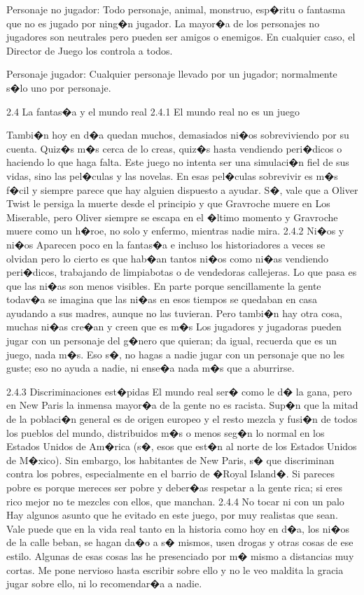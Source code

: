 Personaje no jugador: 
Todo personaje, animal, monstruo, esp�ritu o fantasma que no es jugado por ning�n jugador. La mayor�a de los personajes no jugadores son neutrales pero pueden ser amigos o enemigos. En cualquier caso, el Director de Juego los controla a todos.


Personaje jugador: 
Cualquier personaje llevado por un jugador; normalmente s�lo uno por personaje.


2.4 La fantas�a y el mundo real
2.4.1 El mundo real no es un juego


Tambi�n hoy en d�a quedan muchos, demasiados ni�os sobreviviendo por su cuenta. Quiz�s m�s cerca de lo creas, quiz�s hasta vendiendo peri�dicos o haciendo lo que haga falta. Este juego no intenta ser una simulaci�n fiel de sus vidas, sino las pel�culas y las novelas. En esas pel�culas sobrevivir es m�s f�cil y siempre parece que hay alguien dispuesto a ayudar. S�, vale que a Oliver Twist le persiga la muerte desde el principio y que Gravroche muere en Los Miserable, pero Oliver siempre se escapa en el �ltimo momento y Gravroche muere como un h�roe, no solo y enfermo, mientras nadie mira.
2.4.2 Ni�os y ni�os
Aparecen poco en la fantas�a e incluso los historiadores a veces se olvidan pero lo cierto es que hab�an tantos ni�os como ni�as vendiendo peri�dicos, trabajando de limpiabotas o de vendedoras callejeras. Lo que pasa es que las ni�as son menos visibles. En parte porque sencillamente la gente todav�a se imagina que las ni�as en esos tiempos se quedaban en casa ayudando a sus madres, aunque no las tuvieran. Pero tambi�n hay otra cosa, muchas ni�as cre�an y creen que es m�s
Los jugadores y jugadoras pueden jugar con un personaje del g�nero que quieran; da igual, recuerda que es un juego, nada m�s. Eso s�, no hagas a nadie jugar con un personaje que no les guste; eso no ayuda a nadie, ni ense�a nada m�s que a aburrirse.


2.4.3 Discriminaciones est�pidas
El mundo real ser� como le d� la gana, pero en New Paris la inmensa mayor�a de la gente no es racista. Sup�n que la mitad de la poblaci�n general es de origen europeo y el resto mezcla y fusi�n de todos los pueblos del mundo, distribuidos m�s o menos seg�n lo normal en los Estados Unidos de Am�rica (s�, esos que est�n al norte de los Estados Unidos de M�xico). 
Sin embargo, los habitantes de New Paris, s� que discriminan contra los pobres, especialmente en el barrio de �Royal Island�. Si pareces pobre es porque mereces ser pobre y deber�as respetar a la gente rica; si eres rico mejor no te mezcles con ellos, que manchan.
2.4.4 No tocar ni con un palo
Hay algunos asunto que he evitado en este juego, por muy realistas que sean. Vale puede que en la vida real tanto en la historia como hoy en d�a, los ni�os de la calle beban, se hagan da�o a s� mismos, usen drogas y otras cosas de ese estilo. Algunas de esas cosas las he presenciado por m� mismo a distancias muy cortas.
Me pone nervioso hasta escribir sobre ello y no le veo maldita la gracia jugar sobre ello, ni lo recomendar�a a nadie.








